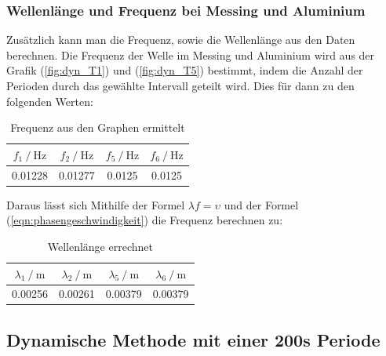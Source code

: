 \noindent
\newpage
\subsubsection{Wellenlänge und Frequenz bei Messing und Aluminium}
    Zusätzlich kann man die Frequenz, sowie die Wellenlänge aus den Daten berechnen. Die Frequenz der Welle im Messing und Aluminium wird aus der Grafik (\ref{fig:dyn_T1}) und (\ref{fig:dyn_T5}) bestimmt, indem die Anzahl der Perioden durch das gewählte Intervall geteilt wird.
    Dies für dann zu den folgenden Werten:
    \begin{table}
        \centering
            \begin{tabular}{c c c c}
            \toprule
            {$   f_1 \mathbin{/}\si{\hertz} $}
            & {$ f_2 \mathbin{/} \si{\hertz} $}
            & {$ f_5 \mathbin{/} \si{\hertz} $}
            & {$ f_6 \mathbin{/} \si{\hertz} $} \\
            \midrule
            0.01228 & 0.01277 & 0.0125 & 0.0125\\
            \bottomrule
            \end{tabular}
        \caption{Frequenz aus den Graphen ermittelt}
        \label{tab:MesWelle}
    \end{table}

\noindent  
    Daraus lässt sich Mithilfe der Formel $\lambda f = \upsilon$ und der Formel (\ref{eqn:phasengeschwindigkeit}) die Frequenz berechnen zu:
\begin{table}
        \centering
            \begin{tabular}{c c c c}
            \toprule
            {$   \lambda_1 \mathbin{/} \si{\meter} $}
            & {$ \lambda_2 \mathbin{/} \si{\meter} $}
            & {$ \lambda_5 \mathbin{/} \si{\meter} $}
            & {$ \lambda_6 \mathbin{/} \si{\meter} $} \\
            \midrule
            0.00256 & 0.00261 & 0.00379 & 0.00379\\
            \bottomrule
            \end{tabular}
        \caption{Wellenlänge errechnet}
        \label{tab:MesWelle}
    \end{table}


    \subsection{Dynamische Methode mit einer 200s Periode}
    
